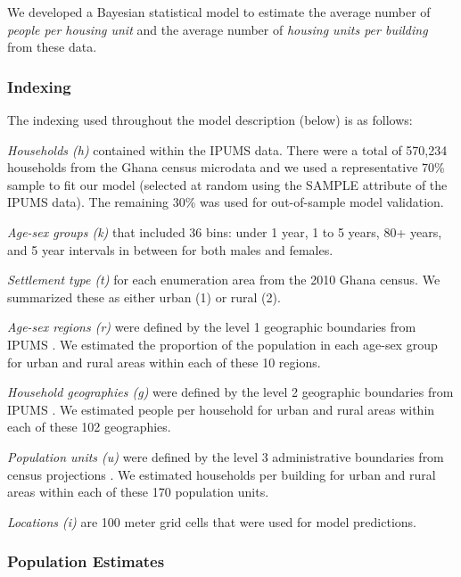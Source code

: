 \documentclass[]{book}
\begin{document}
We developed a Bayesian statistical model to estimate the average number
of \emph{people per housing unit} and the average number of
\emph{housing units per building} from these data.

\subsubsection*{Indexing}\label{indexing}

The indexing used throughout the model description (below) is as
follows:

\emph{Households (h)} contained within the IPUMS data. There were a
total of 570,234 households from the Ghana census microdata and we used
a representative 70\% sample to fit our model (selected at random using
the SAMPLE attribute of the IPUMS data). The remaining 30\% was used for
out-of-sample model validation.

\emph{Age-sex groups (k)} that included 36 bins: under 1 year, 1 to 5
years, 80+ years, and 5 year intervals in between for both males and
females.

\emph{Settlement type (t)} for each enumeration area from the 2010 Ghana
census. We summarized these as either urban (1) or rural (2).

\emph{Age-sex regions (r)} were defined by the level 1 geographic
boundaries from IPUMS \citep{mpc2019integrated}. We estimated the
proportion of the population in each age-sex group for urban and rural
areas within each of these 10 regions.

\emph{Household geographies (g)} were defined by the level 2 geographic
boundaries from IPUMS \citep{mpc2019integrated}. We estimated people per
household for urban and rural areas within each of these 102
geographies.

\emph{Population units (u)} were defined by the level 3 administrative
boundaries from census projections \citep{worldpop2018globalb}. We
estimated households per building for urban and rural areas within each
of these 170 population units.

\emph{Locations (i)} are 100 meter grid cells that were used for model
predictions.

\subsubsection*{Population Estimates}\label{population-estimates}
\end{document}
